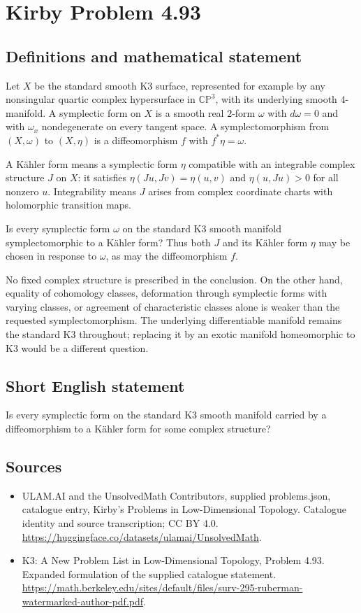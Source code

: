 \documentclass[11pt,a4paper]{article}
\begin{document}
\section*{Kirby Problem 4.93}\label{statement}

\subsection{Definitions and mathematical statement}
Let $X$ be the standard smooth K3 surface, represented for example
by any nonsingular quartic complex hypersurface in
$\mathbb{CP}^3$, with its underlying smooth $4$-manifold.
A symplectic form on $X$ is a smooth real $2$-form $\omega$
with $d\omega=0$ and with $\omega_x$ nondegenerate on every
tangent space. A symplectomorphism from $(X,\omega)$ to
$(X,\eta)$ is a diffeomorphism $f$ with $f^*\eta=\omega$.

A K\"ahler form means a symplectic form $\eta$ compatible with
an integrable complex structure $J$ on $X$: it satisfies
$\eta(Ju,Jv)=\eta(u,v)$ and $\eta(u,Ju)>0$ for all nonzero
$u$. Integrability means $J$ arises from complex coordinate
charts with holomorphic transition maps.

Is every symplectic form $\omega$ on the standard K3 smooth
manifold symplectomorphic to a K\"ahler form? Thus both $J$
and its K\"ahler form $\eta$ may be chosen in response to
$\omega$, as may the diffeomorphism $f$.

No fixed complex structure is prescribed in the conclusion.
On the other hand, equality of cohomology classes, deformation
through symplectic forms with varying classes, or agreement of
characteristic classes alone is weaker than the requested
symplectomorphism. The underlying differentiable manifold remains
the standard K3 throughout; replacing it by an exotic manifold
homeomorphic to K3 would be a different question.
\subsection{Short English statement}
Is every symplectic form on the standard K3 smooth manifold carried by a diffeomorphism to a Kähler form for some complex structure?
\subsection{Sources}
\begin{itemize}
\item[S1] ULAM.AI and the UnsolvedMath Contributors, supplied problems.json, catalogue entry, Kirby's Problems in Low-Dimensional Topology. Catalogue identity and source transcription; CC BY 4.0.
\url{https://huggingface.co/datasets/ulamai/UnsolvedMath}.
\item[S2] K3: A New Problem List in Low-Dimensional Topology, Problem 4.93. Expanded formulation of the supplied catalogue statement.
\url{https://math.berkeley.edu/sites/default/files/surv-295-ruberman-watermarked-author-pdf.pdf}.
\end{itemize}
\end{document}
